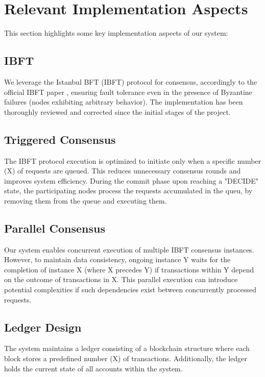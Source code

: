 \section{Relevant Implementation Aspects}

This section highlights some key implementation aspects of our system:

\subsection{IBFT}
We leverage the Istanbul BFT (IBFT) protocol for consensus, accordingly to the official IBFT paper \cite{ibft-paper}, ensuring fault tolerance even in the presence of Byzantine failures (nodes exhibiting arbitrary behavior). The implementation has been thoroughly reviewed and corrected since the initial stages of the project.

\subsection{Triggered Consensus}
The IBFT protocol execution is optimized to initiate only when a specific number (X) of requests are queued. This reduces unnecessary consensus rounds and improves system efficiency. During the commit phase upon reaching a "DECIDE" state, the participating nodes process the requests accumulated in the queu, by removing them from the queue and executing them.

\subsection{Parallel Consensus}
Our system enables concurrent execution of multiple IBFT consensus instances. However, to maintain data consistency, ongoing instance Y waits for the completion of instance X (where X precedes Y) if transactions within Y depend on the outcome of transactions in X. This parallel execution can introduce potential complexities if such dependencies exist between concurrently processed requests. 

\subsection{Ledger Design}
The system maintains a ledger consisting of a blockchain structure where each block stores a predefined number (X) of transactions. Additionally, the ledger holds the current state of all accounts within the system.

